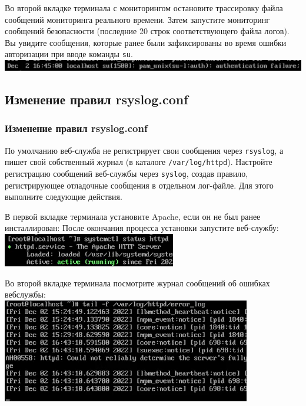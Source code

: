 \documentclass{beamer}
\begin{document}
\begin{frame}[plain]
	Во второй вкладке терминала с мониторингом остановите трассировку файла сообщений мониторинга реального времени. Затем запустите мониторинг сообщений безопасности (последние 20 строк соответствующего файла логов). Вы увидите сообщения, которые ранее были зафиксированы во время ошибки авторизации при вводе команды \texttt{su}.
	\\\includegraphics{5.png}
\end{frame}


\subsection{Изменение правил rsyslog.conf}
\begin{frame}[plain]
	\frametitle{Изменение правил rsyslog.conf}
	По умолчанию веб-служба не регистрирует свои сообщения через \texttt{rsyslog}, а пишет свой собственный журнал (в каталоге \texttt{/var/log/httpd}). Настройте регистрацию сообщений веб-службы через \texttt{syslog}, создав правило, регистрирующее отладочные сообщения в отдельном лог-файле. Для этого выполните следующие действия.
\end{frame}
\begin{frame}[plain]
	В первой вкладке терминала установите Apache, если он не был ранее инсталлирован:
	После окончания процесса установки запустите веб-службу:
	\\\includegraphics{6.png}
\end{frame}
\begin{frame}[plain]
	Во второй вкладке терминала посмотрите журнал сообщений об ошибках вебслужбы:
	\\\includegraphics{7.png}
\end{frame}
\end{document}
